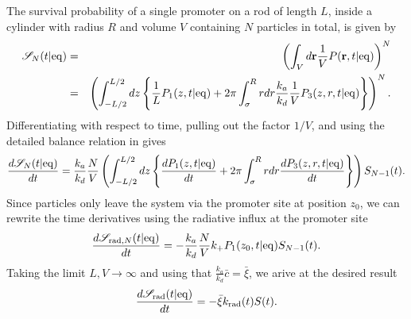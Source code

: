 The survival probability of a single promoter on a rod of length $L$, inside a cylinder with radius $R$ and volume $V$ containing $N$ particles in total, is given by \cite{Szabo1989} 
\begin{eqnarray}
 \mathscr{S}_{N}(t|{\rm eq}) & = & \left( \int_V d{\bf r} \frac{1}{V} P({\bf r},t|{\rm eq}) \right)^N \\
& = & \left( \int_{-L/2}^{L/2} dz \left\{ \frac{1}{L} P_1(z,t|{\rm eq }) + 2\pi \int_{\sigma}^{R} rdr \frac{k_a}{k_d} \frac{1}{V} P_3(z,r,t|{\rm eq}) \right\} \right)^N.\nonumber
\end{eqnarray}
Differentiating with respect to time, pulling out the factor $1/V$, and using the detailed balance relation in  gives
\begin{equation}
 \frac{d\mathscr{S}_{N}(t|{\rm eq})}{dt} = \frac{k_a}{k_d} \frac{N}{V} \left( \int_{-L/2}^{L/2} dz \left\{ \frac{dP_1(z,t|{\rm eq})}{dt} + 2\pi \int_{\sigma}^{R} rdr \frac{dP_3(z,r,t|{\rm eq})}{dt} \right\} \right) S_{N-1}(t).
\end{equation}
Since particles only leave the system via the promoter site at position $z_0$, we can rewrite the time derivatives using the radiative influx at the promoter site
\begin{equation}
 \frac{d\mathscr{S}_{{\rm rad}, N}(t|{\rm eq})}{dt} = -\frac{k_a}{k_d} \frac{N}{V}k_+ P_1(z_0,t|{\rm eq}) S_{N-1}(t).
\end{equation}
Taking the limit $L,V \to \infty$ and using that $\frac{k_a}{k_d} \bar{c} = \bar{\xi}$, we arive at the desired result
\begin{equation}
 \frac{d\mathscr{S}_{{\rm rad}}(t|{\rm eq})}{dt} = - \bar{\xi} k_{\rm rad}(t) S(t).
\end{equation}













